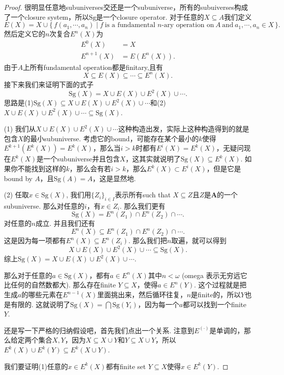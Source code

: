 \documentclass{article}
\newcommand\Set[2]{\{\,#1\mid#2\,\}} %
\newcommand\Sg{\text{Sg}}
\begin{document}
\begin{proof}
很明显任意地subuniverses交还是一个subuniverse，所有的subuiverses构成了一个closure system，所以$\Sg$是一个closure operator. 对于任意的$X \subseteq A$我们定义
$$
E(X) = X \cup \Set{f(a_1,\cdots,a_n)}{f\ \text{is a fundamental $n$-ary operation on}\ A\ \text{and}\ a_1,\cdots,a_n \in X}. 
$$
然后定义它的$n$次复合$E^n(X)$为
$$
\begin{aligned}
E^0(X) &= X \\
E^{n+1}(X) &= E(E^n(X)).
\end{aligned}
$$
由于$A$上所有fundamental operation都是finitary,且有
$$
X \subseteq E(X) \subseteq \cdots \subseteq E^n(X).
$$
接下来我们来证明下面的式子
$$
\Sg(X) = X \cup E(X) \cup E^2(X) \cup \cdots.
$$
思路是(1)$\Sg(X) \subseteq X \cup E(X) \cup E^2(X) \cup \cdots$和(2)$X \cup E(X) \cup E^2(X) \cup \cdots \subseteq \Sg(X)$. 

(1) 我们从$X \cup E(X) \cup E^2(X) \cup \cdots$这种构造出发，实际上这种构造得到的就是包含$X$的最小subuniverse. 考虑它的bound，可能存在某个最小的$k$使得$E^{k+1}(E^k(X)) = E^k(X)$，那么当$i > k$时都有$E^i(X) = E^k(X)$，无疑问现在$E^k(X)$是一个subuniverse并且包含$X$，这其实就说明了$\Sg(X) \subseteq E^k(X)$. 如果你不能找到这样的$k$，那么会有若$i>k$，那么$E^k(X) \subset E^i(X)$，但是它是bound by $A$，且$\Sg(A) = A$，这是显然地.

(2) 任取$x \in \Sg(X)$, 我们用$\{Z_i\}_{i \in I}$表示所有such that $X \subseteq Z$且$Z$是$\mathbf{A}$的一个subuniverse. 那么对任意的$i$，有$x \in Z_i$. 那么我们更有
$$
\Sg(X) = E^n(Z_1) \cap E^n(Z_2) \cap \cdots.
$$
对任意的$n$成立. 并且我们还有
$$
E^n(X) \subseteq E^n(Z_1) \cap E^n(Z_2) \cap \cdots.
$$
这是因为每一项都有$E^n(X) \subseteq E^n(Z_i)$. 那么我们把$n$取遍，就可以得到
$$
X \cup E(X) \cup E^2(X) \cup \cdots \subseteq \Sg(X).
$$
综上$\Sg(X) = X \cup E(X) \cup E^2(X) \cup \cdots.$

那么对于任意的$a \in \Sg(X)$，都有$a \in E^n(X)$其中$n < \omega$ (omega 表示无穷远它比任何的自然数都大). 那么存在finite $Y \subseteq X$，使得$a \in E^n(Y)$. 这个过程就是把生成$a$的哪些元素在$E^{n-1}(X)$里面挑出来，然后循环往复，$n$是finite的，所以$Y$也是有限的. 这就说明了$\Sg(X) = \bigcap \Sg(Y_i)$，因为每一个$a$都可以找到一个finite $Y$.

还是写一下严格的归纳假设吧，首先我们点出一个关系. 注意到$E^(\cdot)$是单调的，那么给定两个集合$X,Y$，因为$X \subseteq X \cup Y$和$Y \subseteq X \cup Y$，所以$E^k(X) \cup E^k(Y) \subseteq E^k(X \cup Y)$.

我们要证明(1)任意的$x \in E^k(X)$都有finite set $Y \subseteq X$使得$x \in E^k(Y)$.


\end{proof}
\end{document}
